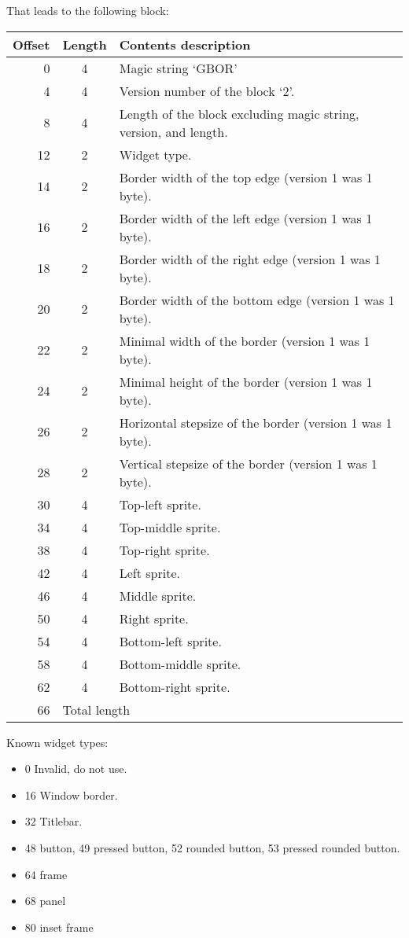 \documentclass{article}
\begin{document}
That leads to the following block:
\begin{center}
\begin{tabular}{|r|c|l|} \hline
\textbf{Offset} & \textbf{Length} & \textbf{Contents description} \\ \hline
   0 &  4 & Magic string `GBOR' \\
   4 &  4 & Version number of the block `2'. \\
   8 &  4 & Length of the block excluding magic string, version, and length. \\
  12 &  2 & Widget type. \\
  14 &  2 & Border width of the top edge (version 1 was 1 byte). \\
  16 &  2 & Border width of the left edge (version 1 was 1 byte). \\
  18 &  2 & Border width of the right edge (version 1 was 1 byte). \\
  20 &  2 & Border width of the bottom edge (version 1 was 1 byte). \\
  22 &  2 & Minimal width of the border (version 1 was 1 byte). \\
  24 &  2 & Minimal height of the border (version 1 was 1 byte). \\
  26 &  2 & Horizontal stepsize of the border (version 1 was 1 byte). \\
  28 &  2 & Vertical stepsize of the border (version 1 was 1 byte). \\
  30 &  4 & Top-left sprite. \\
  34 &  4 & Top-middle sprite. \\
  38 &  4 & Top-right sprite. \\
  42 &  4 & Left sprite. \\
  46 &  4 & Middle sprite. \\
  50 &  4 & Right sprite. \\
  54 &  4 & Bottom-left sprite. \\
  58 &  4 & Bottom-middle sprite. \\
  62 &  4 & Bottom-right sprite. \\
  66 & \multicolumn{2}{l|}{Total length} \\ \hline
\end{tabular}
\end{center}

Known widget types:
\begin{itemize}
\item 0 Invalid, do not use.
\item 16 Window border.
\item 32 Titlebar.
\item 48 button,
      49 pressed button,
      52 rounded button,
      53 pressed rounded button.
\item 64 frame
\item 68 panel
\item 80 inset frame
\end{itemize}
\end{document}
